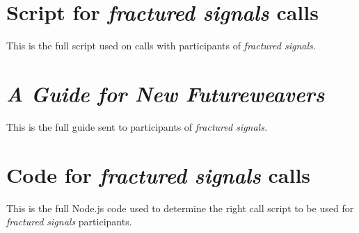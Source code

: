 \chapter{Script for \textit{fractured signals} calls}
\label{appendix:fs-script}
This is the full script used on calls with participants of \textit{fractured signals.}


\chapter{\textit{A Guide for New Futureweavers}}
\label{appendix:guide}
This is the full guide sent to participants of \textit{fractured signals.}


\chapter{Code for \textit{fractured signals} calls}
\label{appendix:code}
This is the full Node.js code used to determine the right call script to be used for \textit{fractured signals} participants.

